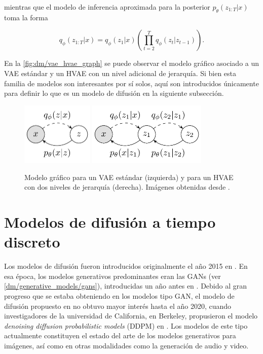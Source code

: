 mientras que el modelo de inferencia aproximada para la posterior $p_\theta(z_{1:T}|x)$ toma la forma

\begin{equation*}
    q_\phi(z_{1:T}|x)
    = q_\phi(z_1|x) \left(\prod_{t=2}^{T} q_\phi(z_t|z_{t-1})\right).
\end{equation*}

En la \autoref{fig:dm/vae_hvae_graph} se puede observar el modelo gráfico asociado a un VAE estándar y un HVAE con un nivel adicional de jerarquía. Si bien esta familia de modelos son interesantes por sí solos, aquí son introducidos únicamente para definir lo que es un modelo de difusión en la siguiente subsección.

\begin{figure}
    \centering
    \includegraphics[height=3cm]{images/dm/vae_graph}
    \hspace{1cm}
    \includegraphics[height=3cm]{images/dm/hvae_graph}
    \caption{Modelo gráfico para un VAE estándar (izquierda) y para un HVAE con dos niveles de jerarquía (derecha). Imágenes obtenidas desde \cite{turner_diffusion_2021}.}
    \label{fig:dm/vae_hvae_graph}
\end{figure}

\section{Modelos de difusión a tiempo discreto}
\label{dm/discrete_dm}

Los modelos de difusión fueron introducidos originalmente el año 2015 en \cite{sohldickstein2015deep}. En esa época, los modelos generativos predominantes eran las GANs (ver \autoref{dm/generative_models/gans}), introducidas un año antes en \cite{goodfellow2014generative}. Debido al gran progreso que se estaba obteniendo en los modelos tipo GAN, el modelo de difusión propuesto en \cite{sohldickstein2015deep} no obtuvo mayor interés hasta el año 2020, cuando investigadores de la universidad de California, en Berkeley, propusieron el modelo \textit{denoising diffusion probabilistic models} (DDPM) en \cite{ho2020denoising}. Los modelos de este tipo actualmente constituyen el estado del arte de los modelos generativos para imágenes, así como en otras modalidades como la generación de audio y video.

